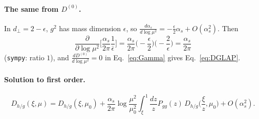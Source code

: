 \documentclass[10pt]{article}
\numberwithin{equation}{section}
\begin{document}
\paragraph{The same from $D^{(0)}$.} In $d_\perp=2-\epsilon$, $g^2$ has mass dimension $\epsilon$, so $\frac{d\alpha_s}{d\log\mu^2}=-\frac\epsilon2\alpha_s+O(\alpha_s^2)$. Then
\begin{equation}
\frac{\partial}{\partial\log\mu^2}\Big[\frac{\alpha_s}{2\pi}\frac1{\bar\epsilon}\Big]=\frac{\alpha_s}{2\pi}\Big(-\frac\epsilon2\Big)\Big(-\frac2\epsilon\Big)=\frac{\alpha_s}{2\pi}
\end{equation}
(\texttt{sympy}: ratio $1$), and $\frac{dD^{(0)}}{d\log\mu^2}=0$ in Eq.~\eqref{eq:Gamma} gives Eq.~\eqref{eq:DGLAP}.

\paragraph{Solution to first order.}
\begin{equation}
D_{h/g}(\xi,\mu)=D_{h/g}(\xi,\mu_0)+\frac{\alpha_s}{2\pi}\log\frac{\mu^2}{\mu_0^2}\int_\xi^1\frac{dz}{z}P_{gg}(z)\,D_{h/g}\Big(\frac{\xi}{z},\mu_0\Big)+O(\alpha_s^2).
\end{equation}

\end{document}
